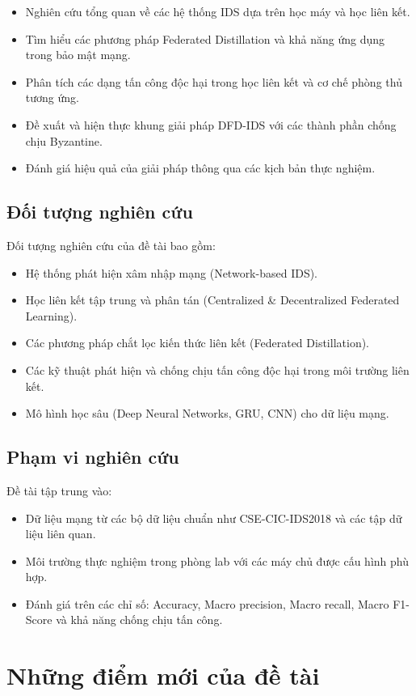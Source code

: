 \begin{itemize}
    \item Nghiên cứu tổng quan về các hệ thống IDS dựa trên học máy và học liên kết.
    \item Tìm hiểu các phương pháp Federated Distillation và khả năng ứng dụng trong bảo mật mạng.
    \item Phân tích các dạng tấn công độc hại trong học liên kết và cơ chế phòng thủ tương ứng.
    \item Đề xuất và hiện thực khung giải pháp DFD-IDS với các thành phần chống chịu Byzantine.
    \item Đánh giá hiệu quả của giải pháp thông qua các kịch bản thực nghiệm.
\end{itemize}

\subsection{Đối tượng nghiên cứu}
Đối tượng nghiên cứu của đề tài bao gồm:
\begin{itemize}
    \item Hệ thống phát hiện xâm nhập mạng (Network-based IDS).
    \item Học liên kết tập trung và phân tán (Centralized \& Decentralized Federated Learning).
    \item Các phương pháp chắt lọc kiến thức liên kết (Federated Distillation).
    \item Các kỹ thuật phát hiện và chống chịu tấn công độc hại trong môi trường liên kết.
    \item Mô hình học sâu (Deep Neural Networks, GRU, CNN) cho dữ liệu mạng.
\end{itemize}

\subsection{Phạm vi nghiên cứu}
Đề tài tập trung vào:
\begin{itemize}
    \item Dữ liệu mạng từ các bộ dữ liệu chuẩn như CSE-CIC-IDS2018 và các tập dữ liệu liên quan.
    \item Môi trường thực nghiệm trong phòng lab với các máy chủ được cấu hình phù hợp.
    \item Đánh giá trên các chỉ số: Accuracy, Macro precision, Macro recall, Macro F1-Score và khả năng chống chịu tấn công.
\end{itemize}

\section{Những điểm mới của đề tài}
\label{sec:novelty}

